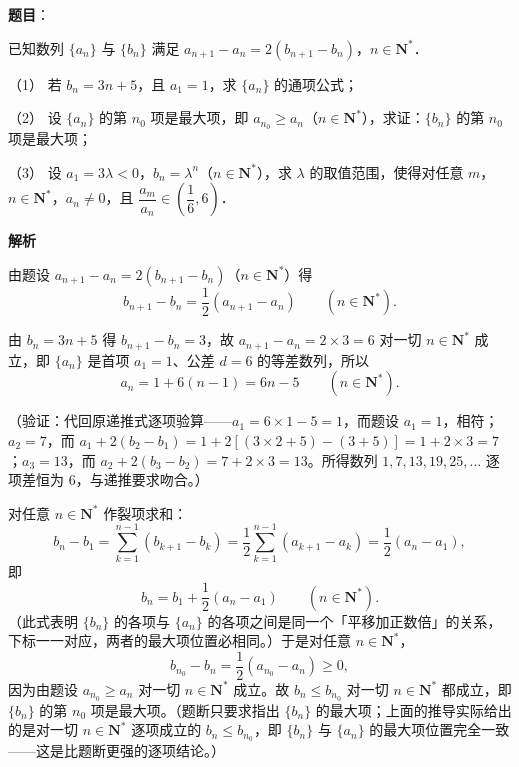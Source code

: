 \begin{answer}

\textbf{题目}：

已知数列 \(\{a_{n}\}\) 与 \(\{b_{n}\}\) 满足 \(a_{n+1}-a_{n}=2(b_{n+1}-b_{n})\)，\(n\in\mathbf{N}^{*}\)．

（1） 若 \(b_{n}=3n+5\)，且 \(a_{1}=1\)，求 \(\{a_{n}\}\) 的通项公式；

（2） 设 \(\{a_{n}\}\) 的第 \(n_{0}\) 项是最大项，即 \(a_{n_{0}}\geqslant a_{n}\)（\(n\in\mathbf{N}^{*}\)），求证：\(\{b_{n}\}\) 的第 \(n_{0}\) 项是最大项；

（3） 设 \(a_{1}=3\lambda<0\)，\(b_{n}=\lambda^{n}\)（\(n\in\mathbf{N}^{*}\)），求 \(\lambda\) 的取值范围，使得对任意 \(m\)，\(n\in\mathbf{N}^{*}\)，\(a_{n}\neq0\)，且 \(\dfrac{a_{m}}{a_{n}}\in\left(\dfrac{1}{6},6\right)\)．

\textbf{解析}

由题设 \(a_{n+1}-a_{n}=2(b_{n+1}-b_{n})\)（\(n\in\mathbf{N}^{*}\)）得
\nopagebreak[4]
\[
b_{n+1}-b_{n}=\frac{1}{2}(a_{n+1}-a_{n})\qquad(n\in\mathbf{N}^{*}).
\]


由 \(b_{n}=3n+5\) 得 \(b_{n+1}-b_{n}=3\)，故 \(a_{n+1}-a_{n}=2\times3=6\) 对一切 \(n\in\mathbf{N}^{*}\) 成立，即 \(\{a_{n}\}\) 是首项 \(a_{1}=1\)、公差 \(d=6\) 的等差数列，所以
\nopagebreak[4]
\[
a_{n}=1+6(n-1)=6n-5\qquad(n\in\mathbf{N}^{*}).
\]

（验证：代回原递推式逐项验算——\(a_{1}=6\times1-5=1\)，而题设 \(a_{1}=1\)，相符；\(a_{2}=7\)，而 \(a_{1}+2(b_{2}-b_{1})=1+2[(3\times2+5)-(3+5)]=1+2\times3=7\)；\(a_{3}=13\)，而 \(a_{2}+2(b_{3}-b_{2})=7+2\times3=13\)。所得数列 \(1,7,13,19,25,\ldots\) 逐项差恒为 \(6\)，与递推要求吻合。）


对任意 \(n\in\mathbf{N}^{*}\) 作裂项求和：
\nopagebreak[4]
\[
b_{n}-b_{1}=\sum_{k=1}^{n-1}(b_{k+1}-b_{k})=\frac{1}{2}\sum_{k=1}^{n-1}(a_{k+1}-a_{k})=\frac{1}{2}(a_{n}-a_{1}),
\]
即
\nopagebreak[4]
\[
b_{n}=b_{1}+\frac{1}{2}(a_{n}-a_{1})\qquad(n\in\mathbf{N}^{*}).
\]
（此式表明 \(\{b_{n}\}\) 的各项与 \(\{a_{n}\}\) 的各项之间是同一个「平移加正数倍」的关系，下标一一对应，两者的最大项位置必相同。）于是对任意 \(n\in\mathbf{N}^{*}\)，
\nopagebreak[4]
\[
b_{n_{0}}-b_{n}=\frac{1}{2}(a_{n_{0}}-a_{n})\geqslant0,
\]
因为由题设 \(a_{n_{0}}\geqslant a_{n}\) 对一切 \(n\in\mathbf{N}^{*}\) 成立。故 \(b_{n}\leqslant b_{n_{0}}\) 对一切 \(n\in\mathbf{N}^{*}\) 都成立，即 \(\{b_{n}\}\) 的第 \(n_{0}\) 项是最大项。（题断只要求指出 \(\{b_{n}\}\) 的最大项；上面的推导实际给出的是对一切 \(n\in\mathbf{N}^{*}\) 逐项成立的 \(b_{n}\leqslant b_{n_{0}}\)，即 \(\{b_{n}\}\) 与 \(\{a_{n}\}\) 的最大项位置完全一致——这是比题断更强的逐项结论。）


\end{answer}
